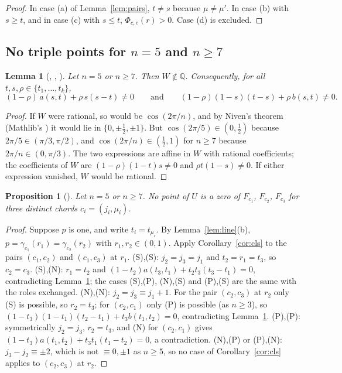 \documentclass[11pt]{amsart}
\theoremstyle{plain}
\newtheorem{lemma}[theorem]{Lemma}
\newtheorem{proposition}[theorem]{Proposition}
\theoremstyle{definition}
\newcommand{\Q}{\mathbb{Q}}
\begin{document}
\begin{proof}
In case (a) of Lemma~\ref{lem:pairs}, $t\ne s$ because $\mu\ne\mu'$. In case (b) with $s\ge t$, and in case (c) with $s\le t$, $\Phi_{c,e}(r)>0$. Case (d) is excluded.
\end{proof}

\subsection{\texorpdfstring{No triple points for $n=5$ and $n\ge7$}{No triple points for n = 5 and n >= 7}}

\begin{lemma}[, , ]\label{lem:irr}
Let $n=5$ or $n\ge7$. Then $W\notin\Q$. Consequently, for all $t,s,\rho\in\{t_1,\dots,t_k\}$,
\[
(1-\rho)\,a(s,t)+\rho\,s(s-t)\ne0\qquad\text{and}\qquad(1-\rho)(1-s)(t-s)+\rho\,b(s,t)\ne0 .
\]
\end{lemma}

\begin{proof}
If $W$ were rational, so would be $\cos(2\pi/n)$, and by Niven's theorem (Mathlib's ) it would lie in $\{0,\pm\frac12,\pm1\}$. But $\cos(2\pi/5)\in(0,\frac12)$ because $2\pi/5\in(\pi/3,\pi/2)$, and $\cos(2\pi/n)\in(\frac12,1)$ for $n\ge7$ because $2\pi/n\in(0,\pi/3)$. The two expressions are affine in $W$ with rational coefficients; the coefficients of $W$ are $(1-\rho)(1-t)s\ne0$ and $\rho t(1-s)\ne0$. If either expression vanished, $W$ would be rational.
\end{proof}

\begin{proposition}[]\label{prop:notriple}
Let $n=5$ or $n\ge7$. No point of $U$ is a zero of $F_{c_1}$, $F_{c_2}$, $F_{c_3}$ for three distinct chords $c_i=(j_i,\mu_i)$.
\end{proposition}

\begin{proof}
Suppose $p$ is one, and write $t_i=t_{\mu_i}$. By Lemma~\ref{lem:line}(b), $p=\gamma_{c_1}(r_1)=\gamma_{c_2}(r_2)$ with $r_1,r_2\in(0,1)$. Apply Corollary~\ref{cor:cls} to the pairs $(c_1,c_2)$ and $(c_1,c_3)$ at $r_1$.
(S),(S): $j_2=j_3=j_1$ and $t_2=r_1=t_3$, so $c_2=c_3$. (S),(N): $r_1=t_2$ and $(1-t_2)a(t_3,t_1)+t_2t_3(t_3-t_1)=0$, contradicting Lemma~\ref{lem:irr}; the cases (S),(P), (N),(S) and (P),(S) are the same with the roles exchanged. (N),(N): $j_2=j_3\equiv j_1+1$. For the pair $(c_2,c_3)$ at $r_2$ only (S) is possible, so $r_2=t_3$; for $(c_2,c_1)$ only (P) is possible (as $n\ge3$), so $(1-t_3)(1-t_1)(t_2-t_1)+t_3b(t_1,t_2)=0$, contradicting Lemma~\ref{lem:irr}. (P),(P): symmetrically $j_2=j_3$, $r_2=t_3$, and (N) for $(c_2,c_1)$ gives $(1-t_3)a(t_1,t_2)+t_3t_1(t_1-t_2)=0$, a contradiction. (N),(P) or (P),(N): $j_3-j_2\equiv\pm2$, which is not $\equiv0,\pm1$ as $n\ge5$, so no case of Corollary~\ref{cor:cls} applies to $(c_2,c_3)$ at $r_2$.
\end{proof}
\end{document}
